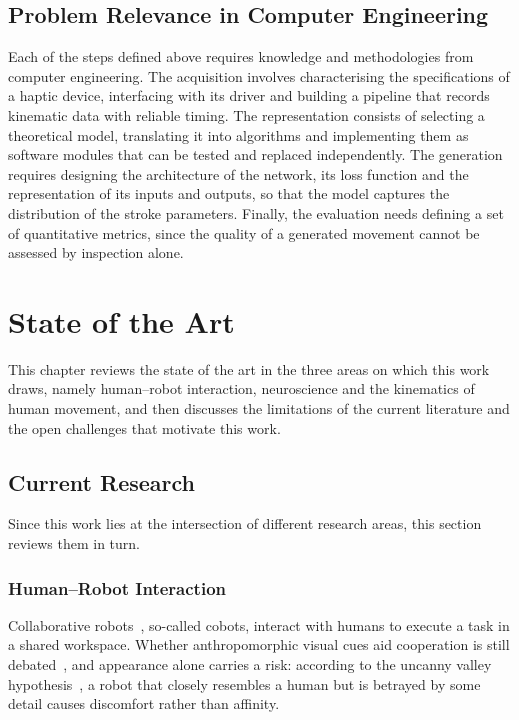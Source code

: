 \documentclass[12pt]{report}
\begin{document}
\section{Problem Relevance in Computer Engineering}
Each of the steps defined above requires knowledge and methodologies from computer engineering. The acquisition involves characterising the specifications of a haptic device, interfacing with its driver and building a pipeline that records kinematic data with reliable timing. The representation consists of selecting a theoretical model, translating it into algorithms and implementing them as software modules that can be tested and replaced independently. The generation requires designing the architecture of the network, its loss function and the representation of its inputs and outputs, so that the model captures the distribution of the stroke parameters. Finally, the evaluation needs defining a set of quantitative metrics, since the quality of a generated movement cannot be assessed by inspection alone.

\chapter{State of the Art}\label{ch:sota}
This chapter reviews the state of the art in the three areas on which this work draws, namely human--robot interaction, neuroscience and the kinematics of human movement, and then discusses the limitations of the current literature and the open challenges that motivate this work.

\section{Current Research}
Since this work lies at the intersection of different research areas, this section reviews them in turn.
\subsection{Human--Robot Interaction}
Collaborative robots~\cite{montini2024}, so-called cobots, interact with humans to execute a task in a shared workspace. Whether anthropomorphic visual cues aid cooperation is still debated~\cite{fink2012,onnasch2021,wittmann2024}, and appearance alone carries a risk: according to the uncanny valley hypothesis~\cite{mori2012}, a robot that closely resembles a human but is betrayed by some detail causes discomfort rather than affinity.
\end{document}
